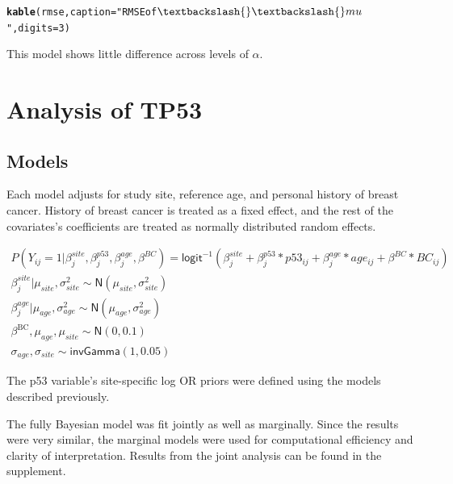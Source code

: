 \documentclass[AMA,STIX1COL]{WileyNJD-v2}\usepackage[]{graphicx}\usepackage[]{color}
\makeatletter
\newcommand{\hlnum}[1]{\textcolor[rgb]{0.686,0.059,0.569}{#1}}%
\newcommand{\hlstr}[1]{\textcolor[rgb]{0.192,0.494,0.8}{#1}}%
\newcommand{\hlstd}[1]{\textcolor[rgb]{0.345,0.345,0.345}{#1}}%
\newcommand{\hlkwc}[1]{\textcolor[rgb]{0.333,0.667,0.333}{#1}}%
\newcommand{\hlkwd}[1]{\textcolor[rgb]{0.737,0.353,0.396}{\textbf{#1}}}%
\newenvironment{kframe}{%
 \def\at@end@of@kframe{}%
 \ifinner\ifhmode%
  \def\at@end@of@kframe{\end{minipage}}%
  \begin{minipage}{\columnwidth}%
 \fi\fi%
 \def\FrameCommand##1{\hskip\@totalleftmargin \hskip-\fboxsep
 \colorbox{shadecolor}{##1}\hskip-\fboxsep
     \hskip-\linewidth \hskip-\@totalleftmargin \hskip\columnwidth}%
 \MakeFramed {\advance\hsize-\width
   \@totalleftmargin\z@ \linewidth\hsize
   \@setminipage}}%
 {\par\unskip\endMakeFramed%
 \at@end@of@kframe}
\newenvironment{knitrout}{}{} %
\makeatother
\begin{document}
\begin{knitrout}
\begin{kframe}
\begin{alltt}
\hlkwd{kable}\hlstd{(rmse,}\hlkwc{caption}\hlstd{=}\hlstr{"RMSE of $\textbackslash{}\textbackslash{}mu$"}\hlstd{,} \hlkwc{digits}\hlstd{=}\hlnum{3}\hlstd{)}
\end{alltt}
\end{kframe}
\end{knitrout}


\begin{figure}

\end{figure}


\begin{figure}

\end{figure}
This model shows little difference across levels of $\alpha$.

\section{Analysis of TP53}\label{sec:tp53}

\subsection{Models}


Each model adjusts for study site, reference age, and personal history of breast cancer. History of breast cancer is treated as a fixed effect, and the rest of the covariates's coefficients are treated as normally distributed random effects. 

\begin{gather}
P(Y_{ij}=1| \beta^{site}_{ j}, \beta^{p53}_{j}, \beta^{age}_{j},\beta^{BC}) = \textsf{logit}^{-1}(\beta^{site}_{ j}+ \beta^{p53}_{j}*p53_{ij}+ \beta^{age}_{j}*age_{ij}+\beta^{BC}* BC_{ij})\\
\beta^{site}_{ j}|\mu_{site}, \sigma_{site}^{2}\sim \textsf{N}(\mu_{site}, \sigma_{site}^{2})\\
\beta^{age}_{j}|\mu_{age}, \sigma^{2}_{age}\sim \textsf{N}(\mu_{age}, \sigma^{2}_{age})\\
\beta^{\text{BC}}, \mu_{age},\mu_{site}\sim \textsf{N}(0,0.1)\\
\sigma_{age},\sigma_{site} \sim \textsf{invGamma}(1, 0.05)
\end{gather}

The p53 variable's site-specific log OR priors were defined using the models described previously.

The fully Bayesian model was fit jointly as well as marginally. Since the results were very similar, the marginal models were used for computational efficiency and clarity of interpretation. Results from the joint analysis can be found in the supplement.
\end{document}
